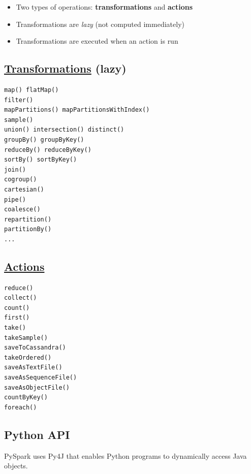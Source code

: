 \documentclass[11pt]{article}
\providecommand{\tightlist}{%
      \setlength{\itemsep}{0pt}\setlength{\parskip}{0pt}}
\begin{document}
\begin{itemize}
\tightlist
\item
  Two types of operations: \textbf{transformations} and \textbf{actions}
\item
  Transformations are \emph{lazy} (not computed immediately)
\item
  Transformations are executed when an action is run
\end{itemize}

    \subsection{\texorpdfstring{\href{https://spark.apache.org/docs/latest/rdd-programming-guide.html\#transformations}{Transformations}
(lazy)}{Transformations (lazy)}}\label{transformations-lazy}

\begin{verbatim}
map() flatMap()
filter() 
mapPartitions() mapPartitionsWithIndex() 
sample()
union() intersection() distinct()
groupBy() groupByKey()
reduceBy() reduceByKey()
sortBy() sortByKey()
join()
cogroup()
cartesian()
pipe()
coalesce()
repartition()
partitionBy()
...
\end{verbatim}

    \subsection{\texorpdfstring{\href{https://spark.apache.org/docs/latest/rdd-programming-guide.html\#actions}{Actions}}{Actions}}\label{actions}

\begin{verbatim}
reduce()
collect()
count()
first()
take()
takeSample()
saveToCassandra()
takeOrdered()
saveAsTextFile()
saveAsSequenceFile()
saveAsObjectFile()
countByKey()
foreach()
\end{verbatim}

    \subsection{Python API}\label{python-api}

PySpark uses Py4J that enables Python programs to dynamically access
Java objects.
\end{document}
